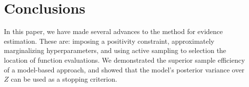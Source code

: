 \documentclass{article}
\begin{document}
\section{Conclusions}

 In this paper, we have made several advances to the  method for evidence estimation.  These are: imposing a positivity constraint, approximately marginalizing hyperparameters, and using active sampling to selection the location of function evaluations.  We demonstrated the superior sample efficiency of a model-based approach, and showed that the model's posterior variance over $Z$ can be used as a stopping criterion.













%
%
\end{document}
